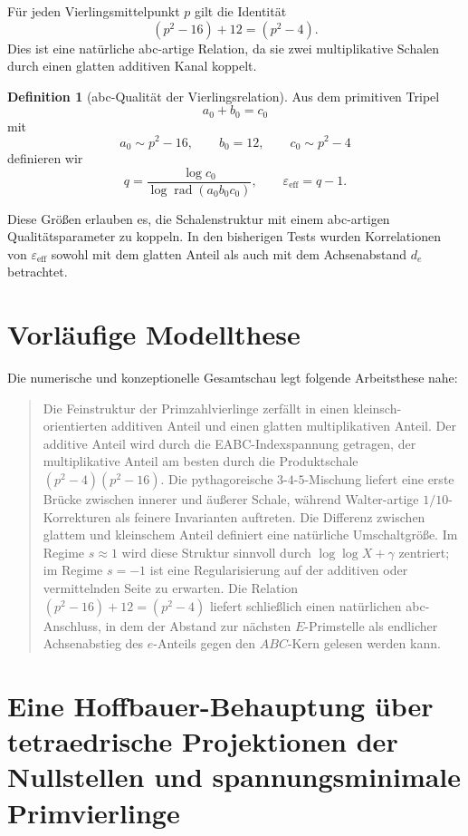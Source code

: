\documentclass[11pt,a4paper]{article}
\theoremstyle{definition}
\newtheorem{definition}{Definition}
\begin{document}
Für jeden Vierlingsmittelpunkt $p$ gilt die Identität
\[
(p^2-16)+12=(p^2-4).
\]
Dies ist eine natürliche abc-artige Relation, da sie zwei multiplikative Schalen durch einen glatten additiven Kanal koppelt.

\begin{definition}[abc-Qualität der Vierlingsrelation]
Aus dem primitiven Tripel
\[
a_0+b_0=c_0
\]
mit
\[
a_0\sim p^2-16,\qquad b_0=12,\qquad c_0\sim p^2-4
\]
definieren wir
\[
q=\frac{\log c_0}{\log\operatorname{rad}(a_0b_0c_0)},
\qquad
\varepsilon_{\mathrm{eff}}=q-1.
\]
\end{definition}

Diese Größen erlauben es, die Schalenstruktur mit einem abc-artigen Qualitätsparameter zu koppeln. In den bisherigen Tests wurden Korrelationen von $\varepsilon_{\mathrm{eff}}$ sowohl mit dem glatten Anteil als auch mit dem Achsenabstand $d_e$ betrachtet.

\section{Vorläufige Modellthese}

Die numerische und konzeptionelle Gesamtschau legt folgende Arbeitsthese nahe:

\begin{quote}
Die Feinstruktur der Primzahlvierlinge zerfällt in einen kleinsch-orientierten additiven Anteil und einen glatten multiplikativen Anteil. Der additive Anteil wird durch die EABC-Indexspannung getragen, der multiplikative Anteil am besten durch die Produktschale $(p^2-4)(p^2-16)$. Die pythagoreische $3$-$4$-$5$-Mischung liefert eine erste Brücke zwischen innerer und äußerer Schale, während Walter-artige $1/10$-Korrekturen als feinere Invarianten auftreten. Die Differenz zwischen glattem und kleinschem Anteil definiert eine natürliche Umschaltgröße. Im Regime $s\approx 1$ wird diese Struktur sinnvoll durch $\log\log X+\gamma$ zentriert; im Regime $s=-1$ ist eine Regularisierung auf der additiven oder vermittelnden Seite zu erwarten. Die Relation $(p^2-16)+12=(p^2-4)$ liefert schließlich einen natürlichen abc-Anschluss, in dem der Abstand zur nächsten $E$-Primstelle als endlicher Achsenabstieg des $e$-Anteils gegen den $ABC$-Kern gelesen werden kann.
\end{quote}

\section{Eine Hoffbauer-Behauptung über tetraedrische Projektionen der Nullstellen und spannungsminimale Primvierlinge}
\end{document}
